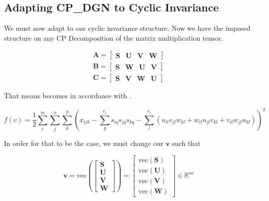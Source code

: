 \newpage
\subsection{Adapting CP\_DGN to Cyclic Invariance} \label{Adapting CP-DGN to Cyclic Invariance}

    We must now adapt  to our cyclic
    invariance structure. Now we have the imposed structure on any CP
    Decomposition of the matrix multiplication tensor. 

    \begin{equation*}
        \begin{array}{rcl}
            \mathbf{A} = [\begin{array}{cccc} \mathbf S & \mathbf U & \mathbf V & \mathbf W \end{array}]\\
            \mathbf{B} = [\begin{array}{cccc} \mathbf S & \mathbf W & \mathbf U & \mathbf V \end{array}]\\
            \mathbf{C} = [\begin{array}{cccc} \mathbf S & \mathbf V & \mathbf W & \mathbf U \end{array}]
        \end{array}
    \end{equation*}

    That means  becomes 
    in accordance with . 

    \begin{equation} \label{eq:ci_cp_least_squares}
        f(v) = \frac{1}{2} \sum_{i}^m \sum_{j}^n \sum_{k}^p \left( x_{ijk} - \sum_{q}^{r_s} s_{iq}s_{jq}s_{kq} - \sum_{l}^{r_c} (u_{il}v_{jl}w_{kl} + w_{il}u_{jl}v_{kl} + v_{il}w_{jl}u_{kl}) \right)^2
    \end{equation}

    In order for that to be the case, we must change our $\mathbf{v}$ such that

    \begin{equation*}
        \mathbf{v} = \text{vec}
        \left(
        \left[
            \begin{array}{c}
                \mathbf{S} \\
                \mathbf{U} \\
                \mathbf{V} \\
                \mathbf{W}
            \end{array}
        \right]
        \right) = 
        \left[
            \begin{array}{c}
                \text{vec}(\mathbf{S}) \\
                \text{vec}(\mathbf{U}) \\
                \text{vec}(\mathbf{V}) \\
                \text{vec}(\mathbf{W})
            \end{array}
        \right]
        \in \mathbb{R}^{nr}
    \end{equation*}

